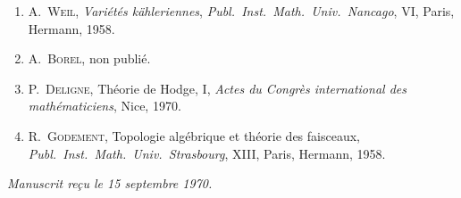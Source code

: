 \documentclass[11pt]{amsart}
\theoremstyle{plain}
\theoremstyle{remark}
\begin{document}
\begin{enumerate}
    \item A.~\textsc{Weil}, \emph{Vari\'et\'es k\"ahleriennes}, \emph{Publ.\ Inst.\ Math.\ Univ.\ Nancago}, VI,
    Paris, Hermann, 1958.

    \item A.~\textsc{Borel}, non publi\'e.

    \item P.~\textsc{Deligne}, Th\'eorie de Hodge, I, \emph{Actes du Congr\`es international des
    math\'ematiciens}, Nice, 1970.

    \item[TF] R.~\textsc{Godement}, Topologie alg\'ebrique et th\'eorie des faisceaux, \emph{Publ.\ Inst.\
    Math.\ Univ.\ Strasbourg}, XIII, Paris, Hermann, 1958.
    \end{enumerate}

    \begin{center}
    \emph{Manuscrit re\c{c}u le 15 septembre 1970.}
    \end{center}

    
\end{document}
